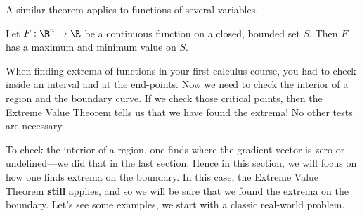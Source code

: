 \documentclass{ximera}
\begin{document}
\begin{theorem}
\begin{image}
\end{image}
\end{theorem}

A similar theorem applies to functions of several variables.

\begin{theorem}
  Let $F:\R^n\to\R$ be a continuous function on a closed, bounded set
  $S$. Then $F$ has a maximum and minimum value on $S$.
\end{theorem}

When finding extrema of functions in your first calculus course, you
had to check inside an interval and at the end-points. Now we need to
check the interior of a region and the boundary curve. If we check
those critical points, then the Extreme Value Theorem tells us that we
have found the extrema! No other tests are necessary.


To check the interior of a region, one finds where the gradient vector
is zero or undefined---we did that in the last section. Hence in this
section, we will focus on how one finds extrema on the boundary. In
this case, the Extreme Value Theorem \textbf{still} applies, and so we
will be sure that we found the extrema on the boundary.  Let's see
some examples, we start with a classic real-world problem.
\end{document}
